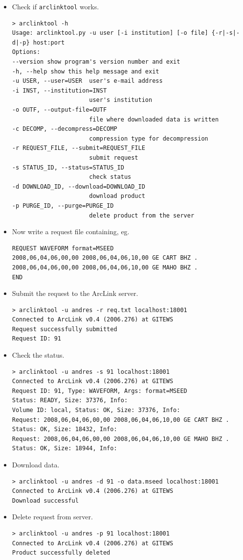 \documentclass[11pt,a4paper,titlepage]{article}
\newcommand{\cmd}[1]{\texttt{#1}}
\begin{document}
\begin{itemize}
\item Check if \cmd{arclinktool} works.
\begin{verbatim}
> arclinktool -h
Usage: arclinktool.py -u user [-i institution] [-o file] {-r|-s|-d|-p} host:port
Options:
--version show program's version number and exit
-h, --help show this help message and exit
-u USER, --user=USER  user's e-mail address
-i INST, --institution=INST
                      user's institution
-o OUTF, --output-file=OUTF
                      file where downloaded data is written
-c DECOMP, --decompress=DECOMP
                      compression type for decompression
-r REQUEST_FILE, --submit=REQUEST_FILE
                      submit request
-s STATUS_ID, --status=STATUS_ID
                      check status
-d DOWNLOAD_ID, --download=DOWNLOAD_ID
                      download product
-p PURGE_ID, --purge=PURGE_ID
                      delete product from the server
\end{verbatim}

\item Now write a request file containing, eg.
\begin{verbatim}
REQUEST WAVEFORM format=MSEED
2008,06,04,06,00,00 2008,06,04,06,10,00 GE CART BHZ .
2008,06,04,06,00,00 2008,06,04,06,10,00 GE MAHO BHZ .
END
\end{verbatim}

\item Submit the request to the ArcLink server.
\begin{verbatim}
> arclinktool -u andres -r req.txt localhost:18001
Connected to ArcLink v0.4 (2006.276) at GITEWS
Request successfully submitted
Request ID: 91
\end{verbatim}

\item Check the status.
\begin{verbatim}
> arclinktool -u andres -s 91 localhost:18001
Connected to ArcLink v0.4 (2006.276) at GITEWS
Request ID: 91, Type: WAVEFORM, Args: format=MSEED
Status: READY, Size: 37376, Info:
Volume ID: local, Status: OK, Size: 37376, Info:
Request: 2008,06,04,06,00,00 2008,06,04,06,10,00 GE CART BHZ .
Status: OK, Size: 18432, Info:
Request: 2008,06,04,06,00,00 2008,06,04,06,10,00 GE MAHO BHZ .
Status: OK, Size: 18944, Info:
\end{verbatim}

\item Download data.
\begin{verbatim}
> arclinktool -u andres -d 91 -o data.mseed localhost:18001
Connected to ArcLink v0.4 (2006.276) at GITEWS
Download successful
\end{verbatim}

\item Delete request from server.
\begin{verbatim}
> arclinktool -u andres -p 91 localhost:18001
Connected to ArcLink v0.4 (2006.276) at GITEWS
Product successfully deleted
\end{verbatim}

\end{itemize}
\end{document}
